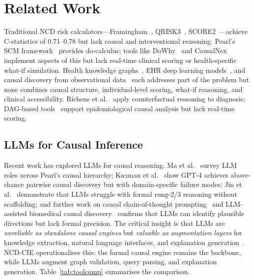 \documentclass[runningheads]{llncs}
\begin{document}
\section{Related Work}\label{sec:related}

Traditional NCD risk calculators---Framingham~\cite{dagostino2008},
QRISK3~\cite{hippisley2017qrisk3}, SCORE2~\cite{score22021}---achieve
C-statistics of 0.71--0.78 but lack causal and interventional reasoning.
Pearl's SCM framework~\cite{pearl2009causality,hernan2020causal}
provides do-calculus; tools like DoWhy~\cite{sharma2020dowhy} and
CausalNex~\cite{beaumont2021causalnex} implement aspects of this but
lack real-time clinical scoring or health-specific what-if simulation.
Health knowledge graphs~\cite{chandak2023primekg,barabasi2011network},
EHR deep learning models~\cite{li2020behrt,rasmy2021medbert}, and
causal discovery from observational data~\cite{prosperi2020causal}
each addresses part of the problem but none combines causal structure,
individual-level scoring, what-if reasoning, and clinical
accessibility.
Richens et al.~\cite{richens2020causal} apply counterfactual
reasoning to diagnosis; DAG-based tools~\cite{textor2016dagitty}
support epidemiological causal analysis but lack real-time scoring.

\subsection{LLMs for Causal Inference}\label{sec:llmcausal}

Recent work has explored LLMs for causal reasoning.
Ma et al.~\cite{ma2024causal} survey LLM roles across Pearl's
causal hierarchy; K{\i}c{\i}man et al.~\cite{kiciman2023causal}
show GPT-4 achieves above-chance pairwise causal discovery but
with domain-specific failure modes; Jin et al.~\cite{jin2023cladder}
demonstrate that LLMs struggle with formal rung-2/3 reasoning
without scaffolding; and further work on causal chain-of-thought
prompting~\cite{ban2023causalcot} and LLM-assisted biomedical
causal discovery~\cite{long2023causal} confirms that LLMs can
identify plausible directions but lack formal precision.
The critical insight is that LLMs are \emph{unreliable as standalone
causal engines} but \emph{valuable as augmentation layers} for
knowledge extraction, natural language interfaces, and explanation
generation~\cite{ma2024causal}.
NCD-CIE operationalises this: the formal causal engine remains
the backbone, while LLMs augment graph validation, query parsing,
and explanation generation.
Table~\ref{tab:toolcomp} summarises the comparison.
\end{document}
